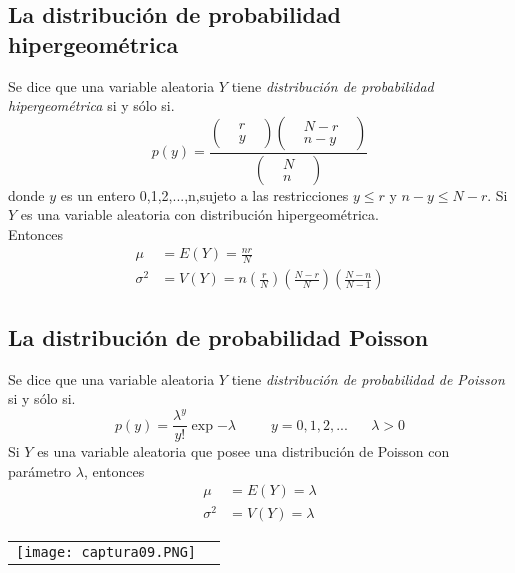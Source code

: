 \documentclass[10pt]{article}\usepackage[]{graphicx}\usepackage[]{color}
\begin{document}
\subsection{La distribución de probabilidad hipergeométrica}
Se dice que una variable aleatoria $Y$ tiene \textit{distribución de probabilidad hipergeométrica} si y sólo si.
\begin{equation*}
p(y)=\frac{\begin{pmatrix}
&r&\\
&y&
\end{pmatrix}
\begin{pmatrix}
&N-r&\\
&n-y&
\end{pmatrix}}{
\begin{pmatrix}
&N&\\
&n&
\end{pmatrix}
}
\end{equation*}
donde $y$ es un entero 0,1,2,...,n,sujeto a las restricciones $y\leq r$ y $n-y\leq N-r$. 
Si $Y$ es una variable aleatoria con distribución hipergeométrica.\\
Entonces
\begin{align*}
\mu&=E(Y)=\frac{nr}{N}\\
\sigma^2&=V(Y)=n(\frac{r}{N})(\frac{N-r}{N})(\frac{N-n}{N-1})
\end{align*}



\subsection{La distribución de probabilidad Poisson}
Se dice que una variable aleatoria $Y$ tiene \textit{distribución de probabilidad de Poisson} si y sólo si.
\begin{equation*}
p(y)=\frac{\lambda^y}{y!}\exp{-\lambda}\; \; \; \; \; \; \; \; \;y=0,1,2,...\; \; \; \; \; \; \lambda>0
\end{equation*}
Si $Y$ es una variable aleatoria que posee una distribución de Poisson con parámetro $\lambda$, entonces
\begin{align*}
\mu&=E(Y)=\lambda\\
\sigma^2&=V(Y)=\lambda
\end{align*}
\begin{tabular}{p{} p{} }
\texttt{[image: captura09.PNG]}
\end{tabular}\\
\end{document}
